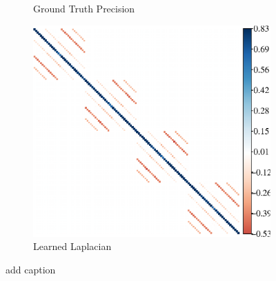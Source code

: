 \begin{figure}[!htb]
\begin{subfigure}[b]{0.3\textwidth}
        \caption{Ground Truth Precision}
    \end{subfigure}
    \hfill %
    \begin{subfigure}[b]{0.3\textwidth}
        \includegraphics[width=\textwidth]{gaussian-process/latex/figures/periodic_gaussian_block_laplacian.eps}
        \caption{Learned Laplacian}
    \end{subfigure}
    \caption{add caption}
        \label{fig:gps}
\end{figure}
